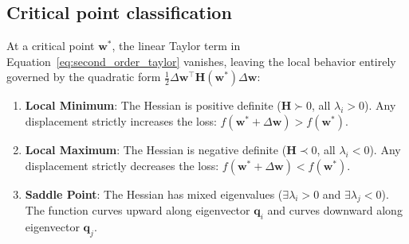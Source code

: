 \subsection{Critical point classification}
\label{sec:hessian_classification}

At a critical point $\mathbf{w}^*$, the linear Taylor term in Equation~\eqref{eq:second_order_taylor} vanishes, leaving the local behavior entirely governed by the quadratic form $\frac{1}{2} \Delta \mathbf{w}^\top \mathbf{H}(\mathbf{w}^*) \Delta \mathbf{w}$:
\begin{enumerate}
  \item \textbf{Local Minimum}: The Hessian is positive definite ($\mathbf{H} \succ 0$, all $\lambda_i > 0$). Any displacement strictly increases the loss: $f(\mathbf{w}^* + \Delta \mathbf{w}) > f(\mathbf{w}^*)$.
  \item \textbf{Local Maximum}: The Hessian is negative definite ($\mathbf{H} \prec 0$, all $\lambda_i < 0$). Any displacement strictly decreases the loss: $f(\mathbf{w}^* + \Delta \mathbf{w}) < f(\mathbf{w}^*)$.
  \item \textbf{Saddle Point}: The Hessian has mixed eigenvalues ($\exists \lambda_i > 0$ and $\exists \lambda_j < 0$). The function curves upward along eigenvector $\mathbf{q}_i$ and curves downward along eigenvector $\mathbf{q}_j$.
\end{enumerate}

